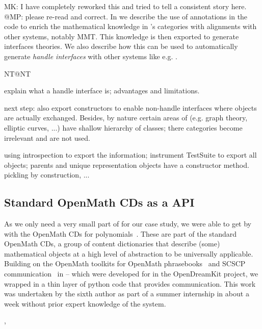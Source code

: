 \begin{newpart}{MK: I have completely reworked this and tried to tell a consistent story
    here. @MP: please re-read and correct.}
In \cite{DehKohKon:iop16} we describe the use of annotations in the code to enrich the
mathematical knowledge in \Sage's categories with alignments with other systems, notably
MMT. This knowledge is then exported to generate interfaces theories. We also describe how
this can be used to automatically generate \emph{handle interfaces} with other systems
like e.g. \GAP.
\begin{todolist}{NT@NT}
\item explain what a handle interface is; advantages and limitations.
\item next step: also export constructors to enable non-handle interfaces where objects
  are actually exchanged. Besides, by nature certain areas of \Sage (e.g. graph theory,
  elliptic curves, ...) have shallow hierarchy of classes; there categories become
  irrelevant and are not used. 
\item using introspection to export the information; instrument TestSuite to export all
  objects; parents and unique representation objects have a constructor method. pickling
  by construction, ...
\end{todolist}

\subsection{Standard OpenMath CDs as a \Singular API}

As we only need a very small part of \Singular for our case study, we were able to get by
with the OpenMath CDs for polynomials~\cite{OMCD:poly:on}. These are part of the standard
OpenMath CDs, a group of content dictionaries that describe (some) mathematical objects at
a high level of abstraction to be universally applicable. Building on the OpenMath
toolkits for OpenMath phrasebooks~\cite{py-openmath:on} and SCSCP
communication~\cite{py-scscp:on} in \Python -- which were developed for \Sage in the
OpenDreamKit project, we wrapped \Singular in a thin layer of python code that provides
\SCSCP communication. This work was undertaken by the sixth author as part of a summer
internship in about a week without prior expert knowledge of the system.
\end{newpart}


, 
